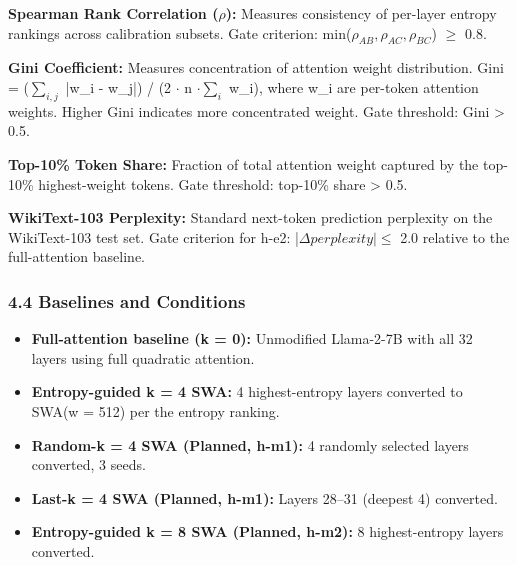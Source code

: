 \textbf{Spearman Rank Correlation ($\rho$):} Measures consistency of per-layer entropy rankings across calibration subsets. Gate criterion: min($\rho_{AB}, \rho_{AC}, \rho_{BC}$) $\geq$ 0.8.

\textbf{Gini Coefficient:} Measures concentration of attention weight distribution. Gini = ($\sum _{i,j}$ |w\_i - w\_j|) / (2 $\cdot$ n $\cdot \sum _i$ w\_i), where w\_i are per-token attention weights. Higher Gini indicates more concentrated weight. Gate threshold: Gini > 0.5.

\textbf{Top-10\% Token Share:} Fraction of total attention weight captured by the top-10\% highest-weight tokens. Gate threshold: top-10\% share > 0.5.

\textbf{WikiText-103 Perplexity:} Standard next-token prediction perplexity on the WikiText-103 test set. Gate criterion for h-e2: |$\Delta perplexity| \leq$ 2.0 relative to the full-attention baseline.

\subsubsection{4.4 Baselines and Conditions}

\begin{itemize}
\item \textbf{Full-attention baseline (k = 0):} Unmodified Llama-2-7B with all 32 layers using full quadratic attention.
\item \textbf{Entropy-guided k = 4 SWA:} 4 highest-entropy layers converted to SWA(w = 512) per the entropy ranking.
\item \textbf{Random-k = 4 SWA (Planned, h-m1):} 4 randomly selected layers converted, 3 seeds.
\item \textbf{Last-k = 4 SWA (Planned, h-m1):} Layers 28--31 (deepest 4) converted.
\item \textbf{Entropy-guided k = 8 SWA (Planned, h-m2):} 8 highest-entropy layers converted.
\end{itemize}

